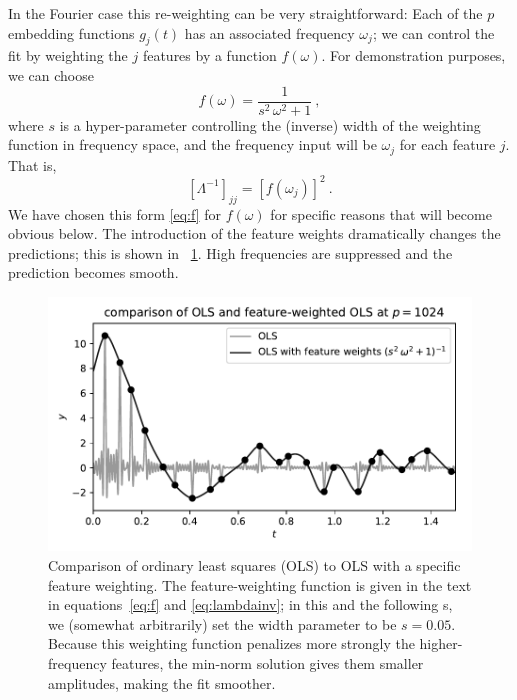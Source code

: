 \documentclass[12pt,letterpaper]{article}
\newlength{\figurewidth}
\begin{document}
In the Fourier case this re-weighting can be very straightforward: Each of the $p$ embedding functions $g_j(t)$ has an associated frequency $\omega_j$; we can control the fit by weighting the $j$ features by a function $f(\omega)$.
For demonstration purposes, we can choose
\begin{equation}\label{eq:f}
    f(\omega) = \frac{1}{s^2\,\omega^2 + 1}
    ~,
\end{equation}
where $s$ is a hyper-parameter controlling the (inverse) width of the weighting function in frequency space, and the frequency input will be $\omega_j$ for each feature $j$. That is,
\begin{equation}\label{eq:lambdainv}
    [\Lambda^{-1}]_{jj} = [f(\omega_j)]^2
    ~.
\end{equation}
We have chosen this form \eqref{eq:f} for $f(\omega)$ for specific reasons that will become obvious below.
The introduction of the feature weights dramatically changes the predictions; this is shown in \figurename~\ref{fig:fwols}.
High frequencies are suppressed and the prediction becomes smooth.
\begin{figure}[t]
    \begin{mdframed}
    \includegraphics[width=\figurewidth]{./weighted-OLS.pdf}
    \caption{Comparison of ordinary least squares (OLS) to OLS with a specific feature weighting. The feature-weighting function is given in the text in equations~\eqref{eq:f} and \eqref{eq:lambdainv}; in this and the following \figurename s, we (somewhat arbitrarily) set the width parameter to be $s=0.05$. Because this weighting function penalizes more strongly the higher-frequency features, the min-norm solution gives them smaller amplitudes, making the fit smoother.}
    \label{fig:fwols}
    \end{mdframed}
\end{figure}
\end{document}
